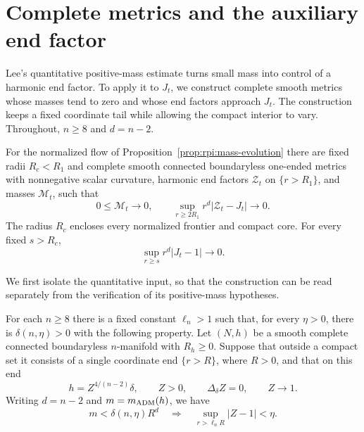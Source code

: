 \section{Complete metrics and the auxiliary end factor}
\label{sec:rpi:lee-completion}

Lee's quantitative positive-mass estimate turns small mass into control
of a harmonic end factor. To apply it to $J_t$, we construct complete
smooth metrics whose masses tend to zero and whose end factors approach
$J_t$. The construction keeps a fixed coordinate tail while allowing
the compact interior to vary. Throughout, $n\ge8$ and $d=n-2$.

\begin{proposition}
\label{prop:rpi:complete-end-factors}
For the normalized flow of Proposition~\ref{prop:rpi:mass-evolution}
there are fixed radii $R_c<R_1$
and complete smooth connected boundaryless one-ended metrics with nonnegative scalar
curvature, harmonic end factors $\mathcal Z_t$ on $\{r>R_1\}$,
and masses $\mathcal M_t$, such that
\[
 0\le\mathcal M_t\longrightarrow0,\qquad
 \sup_{r\ge2R_1}r^d|\mathcal Z_t-J_t|\longrightarrow0.
\]
The radius $R_c$ encloses every normalized frontier and compact core.
For every fixed $s>R_c$,
\begin{equation}\label{eq:rpi:auxiliary-weighted-limit}
 \sup_{r\ge s}r^d|J_t-1|\longrightarrow0.
\end{equation}
\end{proposition}

We first isolate the quantitative input, so that the construction can
be read separately from the verification of its positive-mass hypotheses.

\begin{lemma}
\label{lem:rpi:quantitative-one-end}
For each $n\ge8$ there is a fixed constant $\ell_n>1$ such that,
for every $\eta>0$, there is $\delta(n,\eta)>0$ with the following
property. Let $(N,h)$ be a smooth complete connected boundaryless
$n$-manifold with $R_h\ge0$. Suppose that outside a compact set it
consists of a single coordinate end $\{r>R\}$, where $R>0$, and that
on this end
\[
 h=Z^{4/(n-2)}\delta,\qquad Z>0,\qquad
 \Delta_\delta Z=0,\qquad Z\longrightarrow1.
\]
Writing $d=n-2$ and $m=m_{\rm ADM}(h)$, we have
\[
 m<\delta(n,\eta)R^d
 \quad\Longrightarrow\quad
 \sup_{r>\ell_nR}|Z-1|<\eta.
\]
\end{lemma}

